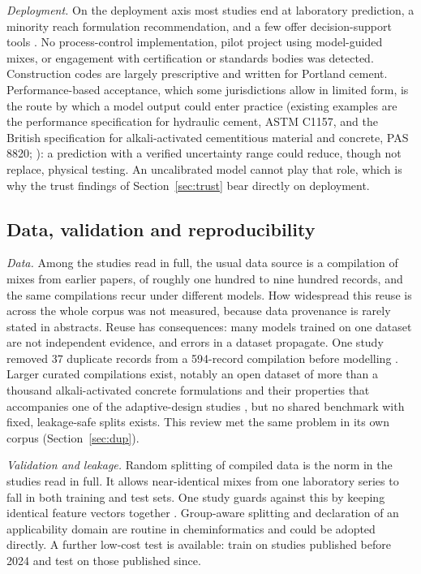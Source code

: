 \documentclass[pdflatex,sn-basic]{sn-jnl}
\begin{document}
\emph{Deployment.} On the deployment axis most studies end at laboratory prediction, a minority reach formulation recommendation, and a few offer decision-support tools \citep{natarajan2026,kazemi2025}. No process-control implementation, pilot project using model-guided mixes, or engagement with certification or standards bodies was detected. Construction codes are largely prescriptive and written for Portland cement. Performance-based acceptance, which some jurisdictions allow in limited form, is the route by which a model output could enter practice (existing examples are the performance specification for hydraulic cement, ASTM C1157, and the British specification for alkali-activated cementitious material and concrete, PAS 8820; \citealp{astmc1157,pas8820}): a prediction with a verified uncertainty range could reduce, though not replace, physical testing. An uncalibrated model cannot play that role, which is why the trust findings of Section~\ref{sec:trust} bear directly on deployment.

\subsection{Data, validation and reproducibility}\label{sec:data}

\emph{Data.} Among the studies read in full, the usual data source is a compilation of mixes from earlier papers, of roughly one hundred to nine hundred records, and the same compilations recur under different models. How widespread this reuse is across the whole corpus was not measured, because data provenance is rarely stated in abstracts. Reuse has consequences: many models trained on one dataset are not independent evidence, and errors in a dataset propagate. One study removed 37 duplicate records from a 594-record compilation before modelling \citep{parakhiya2026}. Larger curated compilations exist, notably an open dataset of more than a thousand alkali-activated concrete formulations and their properties \citep{morenotorres2023} that accompanies one of the adaptive-design studies \citep{volker2023}, but no shared benchmark with fixed, leakage-safe splits exists. This review met the same problem in its own corpus (Section~\ref{sec:dup}).

\emph{Validation and leakage.} Random splitting of compiled data is the norm in the studies read in full. It allows near-identical mixes from one laboratory series to fall in both training and test sets. One study guards against this by keeping identical feature vectors together \citep{parakhiya2026}. Group-aware splitting and declaration of an applicability domain are routine in cheminformatics and could be adopted directly. A further low-cost test is available: train on studies published before 2024 and test on those published since.
\end{document}
